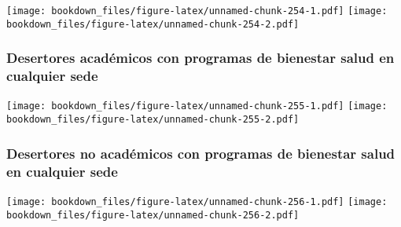 \documentclass[]{article}
\theoremstyle{definition}
\theoremstyle{definition}
\theoremstyle{definition}
\theoremstyle{remark}
\begin{document}
\texttt{[image: bookdown\_files/figure-latex/unnamed-chunk-254-1.pdf]}
\texttt{[image: bookdown\_files/figure-latex/unnamed-chunk-254-2.pdf]}

\subsubsection{Desertores académicos con programas de bienestar salud en
cualquier
sede}\label{desertores-academicos-con-programas-de-bienestar-salud-en-cualquier-sede-3}

\texttt{[image: bookdown\_files/figure-latex/unnamed-chunk-255-1.pdf]}
\texttt{[image: bookdown\_files/figure-latex/unnamed-chunk-255-2.pdf]}

\subsubsection{Desertores no académicos con programas de bienestar salud
en cualquier
sede}\label{desertores-no-academicos-con-programas-de-bienestar-salud-en-cualquier-sede-3}

\texttt{[image: bookdown\_files/figure-latex/unnamed-chunk-256-1.pdf]}
\texttt{[image: bookdown\_files/figure-latex/unnamed-chunk-256-2.pdf]}
\end{document}

